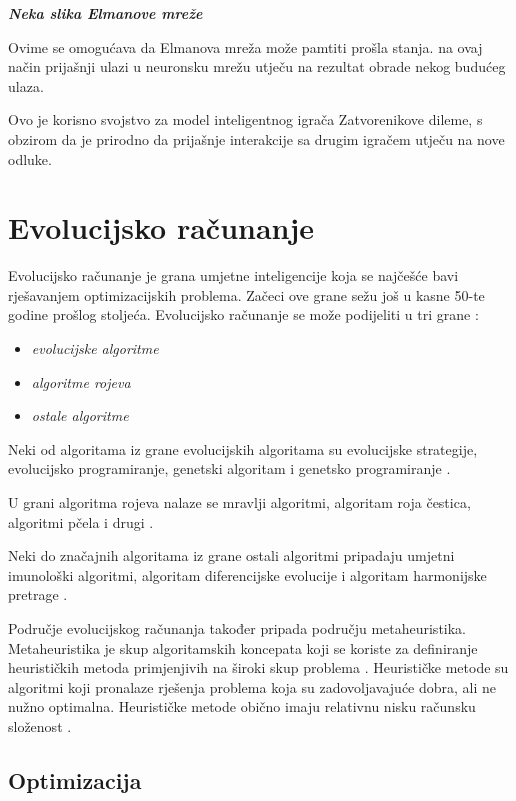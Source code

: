 \documentclass[zavrsnirad]{fer}
\begin{document}
		\textit{\textbf{Neka slika Elmanove mreže}}
		
		Ovime se omogućava da Elmanova mreža može pamtiti prošla stanja. na ovaj način prijašnji ulazi u neuronsku mrežu utječu na rezultat obrade nekog budućeg ulaza.
		
		Ovo je korisno svojstvo za model inteligentnog igrača Zatvorenikove dileme, s obzirom da je prirodno da prijašnje interakcije sa drugim igračem utječu na nove odluke.
	
\chapter{Evolucijsko računanje}

	Evolucijsko računanje je grana umjetne inteligencije koja se najčešće bavi rješavanjem optimizacijskih problema. Začeci ove grane sežu još u kasne 50-te godine prošlog stoljeća. Evolucijsko računanje se može podijeliti u tri grane \cite{skriptaEvolucijskoRacunarstvo}: 
	\begin{itemize}
		\item \textit{evolucijske algoritme}
		\item \textit{algoritme rojeva}
		\item \textit{ostale algoritme}
	\end{itemize}
	
	Neki od algoritama iz grane evolucijskih algoritama su evolucijske strategije, evolucijsko programiranje, genetski algoritam i genetsko programiranje \cite{skriptaEvolucijskoRacunarstvo}.
	
	U grani algoritma rojeva nalaze se mravlji algoritmi, algoritam roja čestica, algoritmi pčela i drugi \cite{skriptaEvolucijskoRacunarstvo}.
	
	Neki do značajnih algoritama iz grane ostali algoritmi pripadaju umjetni imunološki algoritmi, algoritam diferencijske evolucije i algoritam harmonijske pretrage \cite{skriptaEvolucijskoRacunarstvo}.
	
	Područje evolucijskog računanja također pripada području metaheuristika. Metaheuristika je skup algoritamskih koncepata koji se koriste za definiranje heurističkih metoda primjenjivih na široki skup problema \cite{skriptaEvolucijskoRacunarstvo}. Heurističke metode su algoritmi koji pronalaze rješenja problema koja su zadovoljavajuće dobra, ali ne nužno optimalna. Heurističke metode obično imaju relativnu nisku računsku složenost \cite{skriptaEvolucijskoRacunarstvo}.

	\section{Optimizacija}
	
\end{document}
